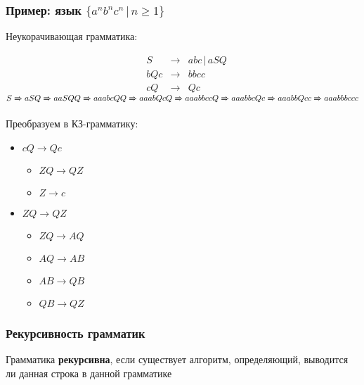 \documentclass{beamer}
\newcommand{\derives}[0]{\xRightarrow[]{}}
\begin{document}
\begin{frame}[fragile]
  \transwipe[direction=90]
  \frametitle{Пример: язык $\{ a^n b^n c^n \, | \, n \geq 1 \}$}
  Неукорачивающая грамматика:

$$
\begin{array}{crcl}
&S& \rightarrow & abc \, | \, a S Q \\
&bQc& \rightarrow & bbcc  \\
&cQ& \rightarrow & Qc
\end{array}
$$
\pause
$S \derives a S Q \derives a a S Q Q \derives a a a b c Q Q \derives aaabQcQ \derives aaabbccQ \derives aaabbcQc \derives aaabbQcc \derives aaabbbccc $
\pause

\vfill

Преобразуем в КЗ-грамматику: \pause

\begin{itemize}
  \item $c Q \rightarrow Q c$
  \begin{itemize}
    \item $Z Q \rightarrow Q Z$
    \item $Z \rightarrow c$
  \end{itemize} \pause
  \item $Z Q \rightarrow Q Z$
  \begin{itemize}
    \item $Z Q \rightarrow A Q$
    \item $A Q \rightarrow A B$
    \item $A B \rightarrow Q B$
    \item $Q B \rightarrow Q Z$
  \end{itemize}
\end{itemize}
\end{frame}


\begin{frame}[fragile]
  \transwipe[direction=90]
  \frametitle{Рекурсивность грамматик}

\begin{center}
    Грамматика \textbf{рекурсивна}, если существует алгоритм, определяющий, выводится ли данная строка в данной грамматике
\end{center}
\end{frame}
\end{document}
